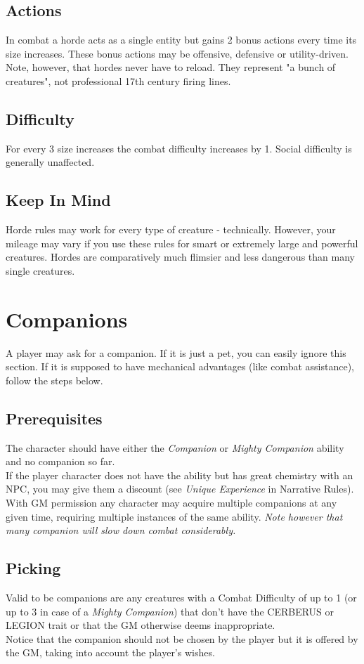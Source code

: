 \documentclass[12pt,a4paper,openany]{book}
\begin{document}
	\subsection*{Actions}
	In combat a horde acts as a single entity but gains 2 bonus actions every time its size increases. These bonus actions may be offensive, defensive or utility-driven. \\
	Note, however, that hordes never have to reload. They represent "a bunch of creatures", not professional 17th century firing lines.
	
	\subsection*{Difficulty}
	For every 3 size increases the combat difficulty increases by 1. Social difficulty is generally unaffected.
	
	\subsection*{Keep In Mind}
	Horde rules may work for every type of creature - technically. However, your mileage may vary if you use these rules for smart or extremely large and powerful creatures. Hordes are comparatively much flimsier and less dangerous than many single creatures.
	
	
	\section{Companions}
	A player may ask for a companion. If it is just a pet, you can easily ignore this section. If it is supposed to have mechanical advantages (like combat assistance), follow the steps below.
	\subsection{Prerequisites}
	The character should have either the \textit{Companion} or \textit{Mighty Companion} ability and no companion so far.\\
	If the player character does not have the ability but has great chemistry with an NPC, you may give them a discount (see \textit{Unique Experience} in Narrative Rules).\\
	With GM permission any character may acquire multiple companions at any given time, requiring multiple instances of the same ability. \textit{Note however that many companion will slow down combat considerably.}
	\subsection{Picking}
	Valid to be companions are any creatures with a Combat Difficulty of up to 1 (or up to 3 in case of a \textit{Mighty Companion}) that don't have the CERBERUS or LEGION trait or that the GM otherwise deems inappropriate.\\
	Notice that the companion should not be chosen by the player but it is offered by the GM, taking into account the player's wishes.
\end{document}
